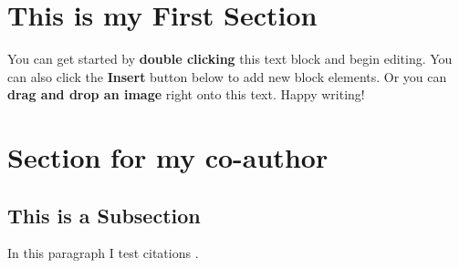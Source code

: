


\section{This is my First Section}

You can get started by \textbf{double clicking} this text block and begin editing. You can also click the \textbf{Insert} button below to add new block elements. Or you can \textbf{drag and drop an image} right onto this text. Happy writing!

\section{Section for my co-author}
\subsection{This is a Subsection}

In this paragraph I test citations \cite{Jentzsch_2014}.




